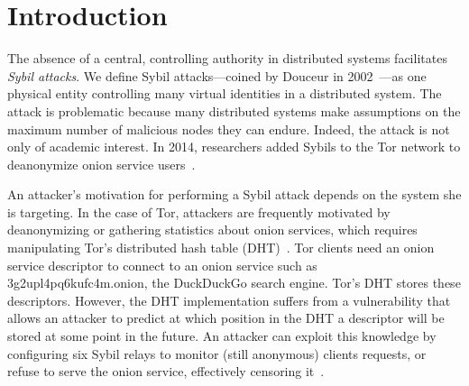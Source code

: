 \section{Introduction}
\label{sec:introduction}

The absence of a central, controlling authority in distributed systems
facilitates \emph{Sybil attacks}.  We define Sybil attacks---coined by Douceur
in 2002~\cite{Douceur2002a}---as one physical entity controlling many virtual
identities in a distributed system.  The attack is problematic because many
distributed systems make assumptions on the maximum number of malicious nodes
they can endure.  Indeed, the attack is not only of academic interest.  In 2014,
researchers added Sybils to the Tor network to deanonymize onion service
users~\cite{cmucert}.

An attacker's motivation for performing a Sybil attack depends on the system she
is targeting.  In the case of Tor, attackers are frequently motivated by
deanonymizing or gathering statistics about onion services, which requires
manipulating Tor's distributed hash table (DHT)~\cite{rendspec}.  Tor clients
need an onion service descriptor to connect to an onion service such as
3g2upl4pq6kufc4m.onion, the DuckDuckGo search engine.  Tor's DHT stores these
descriptors.  However, the DHT implementation suffers from a vulnerability that
allows an attacker to predict at which position in the DHT a descriptor will be
stored at some point in the future.  An attacker can exploit this knowledge by
configuring six Sybil relays to monitor (still anonymous) clients requests, or
refuse to serve the onion service, effectively censoring it~\cite{Biryukov2013a}.

